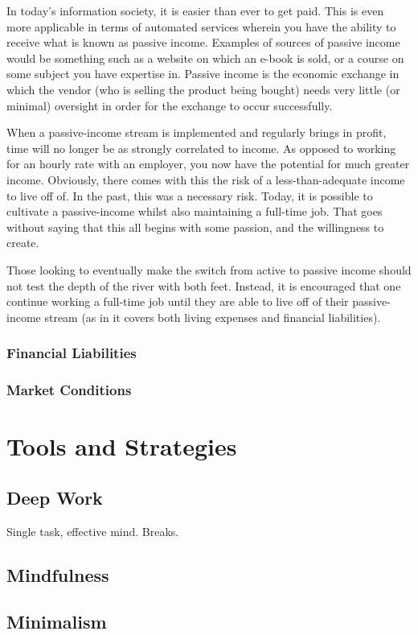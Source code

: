 \documentclass{book}
\numberwithin{equation}{section}
\begin{document}
In today's information society, it is easier than ever to get paid. This is even more applicable in terms of automated services wherein you have the ability to receive what is known as passive income. Examples of sources of passive income would be something such as a website on which an e-book is sold, or a course on some subject you have expertise in. Passive income is the economic exchange in which the vendor (who is selling the product being bought) needs very little (or minimal) oversight in order for the exchange to occur successfully. 

When a passive-income stream is implemented and regularly brings in profit, time will no longer be as strongly correlated to income. As opposed to working for an hourly rate with an employer, you now have the potential for much greater income. Obviously, there comes with this the risk of a less-than-adequate income to live off of. In the past, this was a necessary risk. Today, it is possible to cultivate a passive-income whilst also maintaining a full-time job. That goes without saying that this all begins with some passion, and the willingness to create.

Those looking to eventually make the switch from active to passive income should not test the depth of the river with both feet. Instead, it is encouraged that one continue working a full-time job until they are able to live off of their passive-income stream (as in it covers both living expenses and financial liabilities).

\subsection{Financial Liabilities}
\subsection{Market Conditions}
\appendix
\chapter{Tools and Strategies}
\section{Deep Work}
Single task, effective mind. Breaks.
\section{Mindfulness}

\section{Minimalism}
\end{document}
